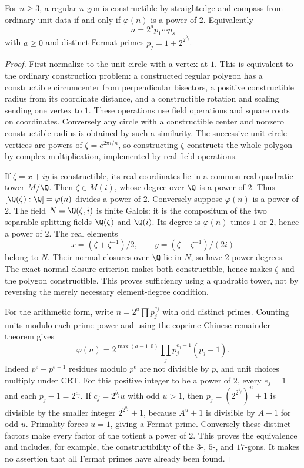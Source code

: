 \begin{theorem}
For $n\geq3$, a regular $n$-gon is constructible by straightedge and compass from ordinary unit data if and only if $\varphi(n)$ is a power of $2$. Equivalently
\[n=2^a p_1\cdots p_s\]
with $a\geq0$ and distinct Fermat primes $p_j=1+2^{2^{b_j}}$.
\end{theorem}
\begin{proof}
First normalize to the unit circle with a vertex at $1$. This is equivalent to the ordinary construction problem: a constructed regular polygon has a constructible circumcenter from perpendicular bisectors, a positive constructible radius from its coordinate distance, and a constructible rotation and scaling sending one vertex to $1$. These operations use field operations and square roots on coordinates. Conversely any circle with a constructible center and nonzero constructible radius is obtained by such a similarity. The successive unit-circle vertices are powers of $\zeta=e^{2\pi i/n}$, so constructing $\zeta$ constructs the whole polygon by complex multiplication, implemented by real field operations.

If $\zeta=x+iy$ is constructible, its real coordinates lie in a common real quadratic tower $M/\Q$. Then $\zeta\in M(i)$, whose degree over $\Q$ is a power of $2$. Thus $[\Q(\zeta):\Q]=\varphi(n)$ divides a power of $2$. Conversely suppose $\varphi(n)$ is a power of $2$. The field $N=\Q(\zeta,i)$ is finite Galois: it is the compositum of the two separable splitting fields $\Q(\zeta)$ and $\Q(i)$. Its degree is $\varphi(n)$ times $1$ or $2$, hence a power of $2$. The real elements
\[x=(\zeta+\zeta^{-1})/2,\qquad y=(\zeta-\zeta^{-1})/(2i)
\]
belong to $N$. Their normal closures over $\Q$ lie in $N$, so have $2$-power degrees. The exact normal-closure criterion makes both constructible, hence makes $\zeta$ and the polygon constructible. This proves sufficiency using a quadratic tower, not by reversing the merely necessary element-degree condition.

For the arithmetic form, write $n=2^a\prod p_j^{e_j}$ with odd distinct primes. Counting units modulo each prime power and using the coprime Chinese remainder theorem gives
\[\varphi(n)=2^{\max(a-1,0)}\prod_j p_j^{e_j-1}(p_j-1).
\]
Indeed $p^e-p^{e-1}$ residues modulo $p^e$ are not divisible by $p$, and unit choices multiply under CRT. For this positive integer to be a power of $2$, every $e_j=1$ and each $p_j-1=2^{c_j}$. If $c_j=2^{b_j}u$ with odd $u>1$, then $p_j=(2^{2^{b_j}})^u+1$ is divisible by the smaller integer $2^{2^{b_j}}+1$, because $A^u+1$ is divisible by $A+1$ for odd $u$. Primality forces $u=1$, giving a Fermat prime. Conversely these distinct factors make every factor of the totient a power of $2$. This proves the equivalence and includes, for example, the constructibility of the $3$-, $5$-, and $17$-gons. It makes no assertion that all Fermat primes have already been found.
\end{proof}



